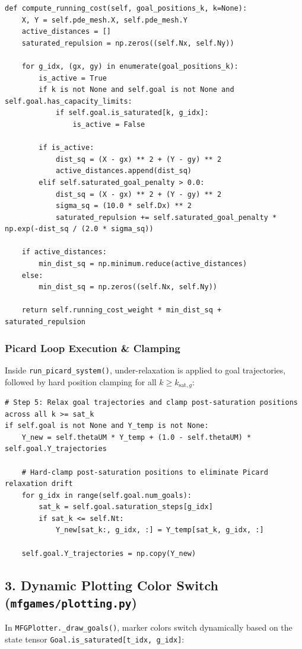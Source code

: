 \documentclass[11pt,a4paper]{article}
\begin{document}
\begin{verbatim}
def compute_running_cost(self, goal_positions_k, k=None):
    X, Y = self.pde_mesh.X, self.pde_mesh.Y
    active_distances = []
    saturated_repulsion = np.zeros((self.Nx, self.Ny))

    for g_idx, (gx, gy) in enumerate(goal_positions_k):
        is_active = True
        if k is not None and self.goal is not None and self.goal.has_capacity_limits:
            if self.goal.is_saturated[k, g_idx]:
                is_active = False

        if is_active:
            dist_sq = (X - gx) ** 2 + (Y - gy) ** 2
            active_distances.append(dist_sq)
        elif self.saturated_goal_penalty > 0.0:
            dist_sq = (X - gx) ** 2 + (Y - gy) ** 2
            sigma_sq = (10.0 * self.Dx) ** 2
            saturated_repulsion += self.saturated_goal_penalty * np.exp(-dist_sq / (2.0 * sigma_sq))

    if active_distances:
        min_dist_sq = np.minimum.reduce(active_distances)
    else:
        min_dist_sq = np.zeros((self.Nx, self.Ny))

    return self.running_cost_weight * min_dist_sq + saturated_repulsion
\end{verbatim}

\subsubsection{Picard Loop Execution \& Clamping}
Inside \texttt{run_picard_system()}, under-relaxation is applied to goal trajectories, followed by hard position clamping for all $k \ge k_{\text{sat}, g}$:

\begin{verbatim}
# Step 5: Relax goal trajectories and clamp post-saturation positions across all k >= sat_k
if self.goal is not None and Y_temp is not None:
    Y_new = self.thetaUM * Y_temp + (1.0 - self.thetaUM) * self.goal.Y_trajectories

    # Hard-clamp post-saturation positions to eliminate Picard relaxation drift
    for g_idx in range(self.goal.num_goals):
        sat_k = self.goal.saturation_steps[g_idx]
        if sat_k <= self.Nt:
            Y_new[sat_k:, g_idx, :] = Y_temp[sat_k, g_idx, :]

    self.goal.Y_trajectories = np.copy(Y_new)
\end{verbatim}

\subsection{3. Dynamic Plotting Color Switch (\texttt{mfgames/plotting.py})}
In \texttt{MFGPlotter._draw_goals()}, marker colors switch dynamically based on the state tensor \texttt{Goal.is_saturated[t_idx, g_idx]}:
\end{document}
